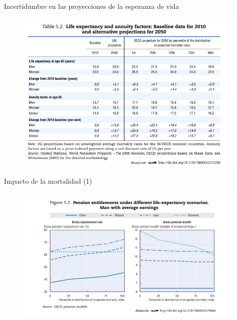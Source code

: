 \documentclass[ignorenonframetext,]{beamer}
\begin{document}
\begin{frame}{Incertidumbre en las proyecciones de la esperanza de vida}

\begin{figure}
\centering
\includegraphics{imgs_reforma/esperanza.png}
\caption{}
\end{figure}

\end{frame}

\begin{frame}{Impacto de la mortalidad (1)}

\begin{figure}
\centering
\includegraphics{imgs_reforma/morta.png}
\caption{}
\end{figure}

\end{frame}
\end{document}
